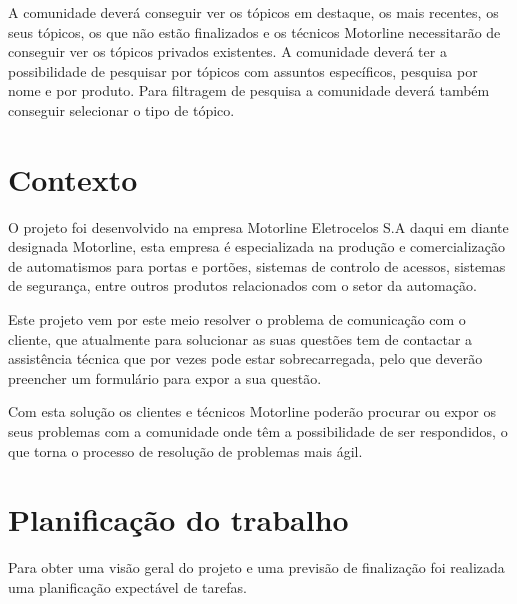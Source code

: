 A comunidade deverá conseguir ver os tópicos em destaque, os mais recentes, os seus tópicos, os que não estão finalizados e os técnicos Motorline necessitarão de conseguir ver os tópicos privados existentes. A comunidade deverá ter a possibilidade de pesquisar por tópicos com assuntos específicos, pesquisa por nome e por produto. Para filtragem de pesquisa a comunidade deverá também conseguir selecionar o tipo de tópico.

\section{Contexto}
O projeto foi desenvolvido na empresa Motorline Eletrocelos S.A daqui em diante designada Motorline, esta empresa é especializada na produção e comercialização de automatismos para portas e portões, sistemas de controlo de acessos, sistemas de segurança, entre outros produtos relacionados com o setor da automação.

Este projeto vem por este meio resolver o problema de comunicação com o cliente, que atualmente para solucionar as suas questões tem de contactar a assistência técnica que por vezes pode estar sobrecarregada, pelo que deverão preencher um formulário para expor a sua questão.

Com esta solução os clientes e técnicos Motorline poderão procurar ou expor os seus problemas com a comunidade onde têm a possibilidade de ser respondidos, o que torna o processo de resolução de problemas mais ágil.

\newpage

\section{Planificação do trabalho}\label{sec:planificacao trabalho}

Para obter uma visão geral do projeto e uma previsão de finalização foi realizada uma planificação expectável de tarefas.


